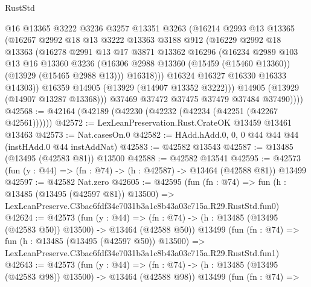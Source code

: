 \begin{lexlean}{RustStd}
\begin{coremodule}
                @16
                @13365
                @3222
                @3236
                @3257
                @13351
                @3263
                (@16214
                  @2993
                  @13
                  @13365
                  (@16267
                    @2992
                    @18
                    @13
                    @3222
                    @13363
                    @3188
                    @912
                    (@16229
                      @2992
                      @18
                      @13363
                      (@16278
                        @2991
                        @13
                        @17
                        @3871
                        @13362
                        @16296
                        (@16234
                          @2989
                          @103
                          @13
                          @16
                          @13360
                          @3236
                          (@16306 @2988 @13360 (@15459 (@15460 @13360)) (@13929 (@15465 @2988 @13)))
                          @16318)))
                    @16324
                    @16327
                    @16330
                    @16333
                    @14303))
                @16359
                @14905
                (@13929 (@14907 @13352 @3222)))
              @14905
              (@13929 (@14907 @13287 @13368)))
            @37469
            @37472
            @37475
            @37479
            @37484
            @37490))))
@42568 := @42164 (@42189 (@42230 (@42232 (@42234 (@42251 (@42267 @42561))))))
@42572 := LexLeanPreservation.Rust.CrateOK @13459 @13461 @13463
@42573 := Nat.casesOn.{0}
@42582 := HAdd.hAdd.{0, 0, 0} @44 @44 @44 (instHAdd.{0} @44 instAddNat)
@42583 := @42582 @13543
@42587 := @13485 (@13495 (@42583 @81)) @13500
@42588 := @42582 @13541
@42595 := @42573 (fun (y : @44) => (fn : @74) -> (h : @42587) -> @13464 (@42588 @81)) @13499
@42597 := @42582 Nat.zero
@42605 := @42595
    (fun (fn : @74) =>
    fun (h : @13485 (@13495 (@42597 @81)) @13500) =>
    LexLeanPreserve.C3bac6fdf34e7031b3a1c8b43a03c715a.R29.RustStd.fun0)
@42624 := @42573
    (fun (y : @44) =>
    (fn : @74) -> (h : @13485 (@13495 (@42583 @50)) @13500) -> @13464 (@42588 @50))
    @13499
    (fun (fn : @74) =>
    fun (h : @13485 (@13495 (@42597 @50)) @13500) =>
    LexLeanPreserve.C3bac6fdf34e7031b3a1c8b43a03c715a.R29.RustStd.fun1)
@42643 := @42573
    (fun (y : @44) =>
    (fn : @74) -> (h : @13485 (@13495 (@42583 @98)) @13500) -> @13464 (@42588 @98))
    @13499
    (fun (fn : @74) =>

\end{coremodule}
\end{lexlean}
